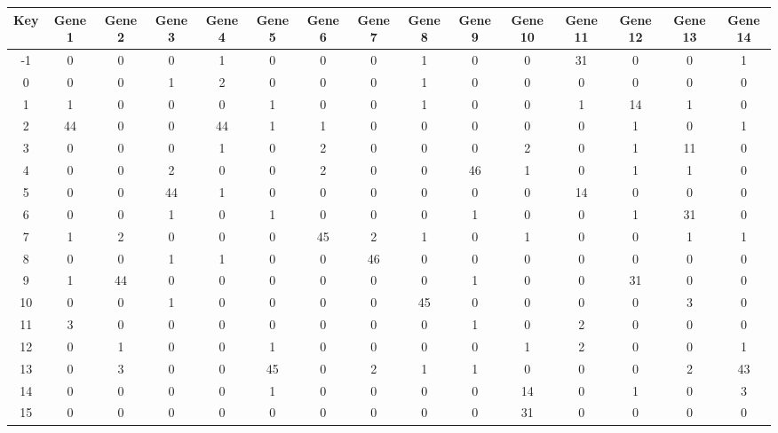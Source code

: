 \begin{tabular}{|c|c|c|c|c|c|c|c|c|c|c|c|c|c|c|}
\hline
Key & Gene 1 & Gene 2 & Gene 3 & Gene 4 & Gene 5 & Gene 6 & Gene 7 & Gene 8 & Gene 9 & Gene 10 & Gene 11 & Gene 12 & Gene 13 & Gene 14 \\
\hline
-1 & 0 & 0 & 0 & 1 & 0 & 0 & 0 & 1 & 0 & 0 & 31 & 0 & 0 & 1 \\
0 & 0 & 0 & 1 & 2 & 0 & 0 & 0 & 1 & 0 & 0 & 0 & 0 & 0 & 0 \\
1 & 1 & 0 & 0 & 0 & 1 & 0 & 0 & 1 & 0 & 0 & 1 & 14 & 1 & 0 \\
2 & 44 & 0 & 0 & 44 & 1 & 1 & 0 & 0 & 0 & 0 & 0 & 1 & 0 & 1 \\
3 & 0 & 0 & 0 & 1 & 0 & 2 & 0 & 0 & 0 & 2 & 0 & 1 & 11 & 0 \\
4 & 0 & 0 & 2 & 0 & 0 & 2 & 0 & 0 & 46 & 1 & 0 & 1 & 1 & 0 \\
5 & 0 & 0 & 44 & 1 & 0 & 0 & 0 & 0 & 0 & 0 & 14 & 0 & 0 & 0 \\
6 & 0 & 0 & 1 & 0 & 1 & 0 & 0 & 0 & 1 & 0 & 0 & 1 & 31 & 0 \\
7 & 1 & 2 & 0 & 0 & 0 & 45 & 2 & 1 & 0 & 1 & 0 & 0 & 1 & 1 \\
8 & 0 & 0 & 1 & 1 & 0 & 0 & 46 & 0 & 0 & 0 & 0 & 0 & 0 & 0 \\
9 & 1 & 44 & 0 & 0 & 0 & 0 & 0 & 0 & 1 & 0 & 0 & 31 & 0 & 0 \\
10 & 0 & 0 & 1 & 0 & 0 & 0 & 0 & 45 & 0 & 0 & 0 & 0 & 3 & 0 \\
11 & 3 & 0 & 0 & 0 & 0 & 0 & 0 & 0 & 1 & 0 & 2 & 0 & 0 & 0 \\
12 & 0 & 1 & 0 & 0 & 1 & 0 & 0 & 0 & 0 & 1 & 2 & 0 & 0 & 1 \\
13 & 0 & 3 & 0 & 0 & 45 & 0 & 2 & 1 & 1 & 0 & 0 & 0 & 2 & 43 \\
14 & 0 & 0 & 0 & 0 & 1 & 0 & 0 & 0 & 0 & 14 & 0 & 1 & 0 & 3 \\
15 & 0 & 0 & 0 & 0 & 0 & 0 & 0 & 0 & 0 & 31 & 0 & 0 & 0 & 0 \\
\hline
\end{tabular}